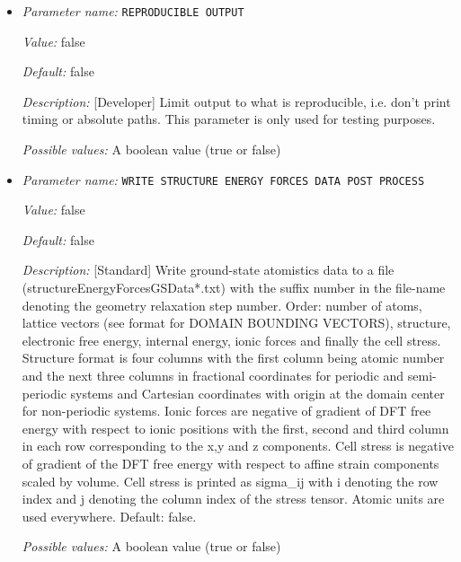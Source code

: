 \begin{itemize}
{\it Value:} false


{\it Default:} false


{\it Description:} [Adavanced] Uses algorithms which have lower peak memory but with a marginal performance degradation. Default: true.


{\it Possible values:} A boolean value (true or false)
\item {\it Parameter name:} {\tt REPRODUCIBLE OUTPUT}
\label{parameters:REPRODUCIBLE OUTPUT}
\label{parameters:REPRODUCIBLE_20OUTPUT}


{\it Value:} false


{\it Default:} false


{\it Description:} [Developer] Limit output to what is reproducible, i.e. don't print timing or absolute paths. This parameter is only used for testing purposes.


{\it Possible values:} A boolean value (true or false)
\item {\it Parameter name:} {\tt WRITE STRUCTURE ENERGY FORCES DATA POST PROCESS}
\label{parameters:WRITE STRUCTURE ENERGY FORCES DATA POST PROCESS}
\label{parameters:WRITE_20STRUCTURE_20ENERGY_20FORCES_20DATA_20POST_20PROCESS}


{\it Value:} false


{\it Default:} false


{\it Description:} [Standard] Write ground-state atomistics data to a file (structureEnergyForcesGSData*.txt) with the suffix number in the file-name denoting the geometry relaxation step number. Order: number of atoms, lattice vectors (see format for DOMAIN BOUNDING VECTORS), structure, electronic free energy, internal energy, ionic forces and finally the cell stress. Structure format is four columns with the first column being atomic number and the next three columns in fractional coordinates for periodic and semi-periodic systems and Cartesian coordinates with origin at the domain center for non-periodic systems. Ionic forces are negative of gradient of DFT free energy with respect to ionic positions with the first, second and third column in each row corresponding to the x,y and z components. Cell stress is negative of gradient of the DFT free energy with respect to affine strain components scaled by volume. Cell stress is printed as sigma\_{ij} with i denoting the row index and j denoting the column index of the stress tensor. Atomic units are used everywhere. Default: false.


{\it Possible values:} A boolean value (true or false)
\end{itemize}



